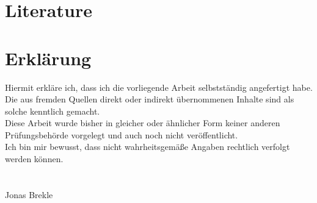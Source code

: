 \documentclass[a4paper]{scrartcl}
\begin{document}




\appendix
\section{Literature}



\newpage

\section*{Erklärung}
\thispagestyle{empty}
Hiermit erkläre ich, dass ich die vorliegende Arbeit selbstständig angefertigt habe. Die aus fremden Quellen direkt oder indirekt übernommenen Inhalte sind als solche kenntlich gemacht.\\
Diese Arbeit wurde bisher in gleicher oder ähnlicher Form keiner anderen Prüfungsbehörde vorgelegt und auch noch nicht veröffentlicht.\\
Ich bin mir bewusst, dass nicht wahrheitsgemäße Angaben rechtlich verfolgt werden können.\\
\vspace{1cm}\\
\makebox[2in]{\hrulefill}\\
Jonas Brekle
\end{document}
